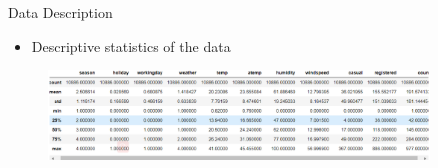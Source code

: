 \documentclass[
 size=14pt,
 paper=smartboard,  %
 mode=present, 		%
 display=slides, 	%
 style=tuliplab,  	%
 pauseslide,
 fleqn,leqno]{powerdot}
\begin{document}
\begin{slide}{Data Description}
  \begin{center}

    {
      \begin{itemize}
        \item
        Descriptive statistics of the data
      \end{itemize}  
      \begin{figure}
        \centering
        \includegraphics[width=0.9\textwidth]{pic/a.eps}
     
      \end{figure}
    

        
       
    }
    \end{center}
    \bigskip
    \begin{center}
    
    \end{center}
    \bigskip



\end{slide}
\end{document}
